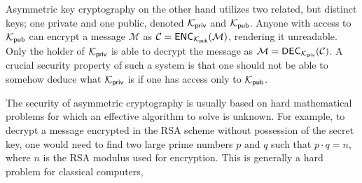 Asymmetric key cryptography on the other hand utilizes two related, but distinct keys; one private and one public, denoted $\mathcal{K}_{\mathsf{priv}}$ and $\mathcal{K}_{\mathsf{pub}}$.
Anyone with access to $\mathcal{K}_{\mathsf{pub}}$ can encrypt a message $\mathcal{M}$ as $\mathcal{C} = \mathsf{ENC}_{\mathcal{K}_{\mathsf{pub}}}(\mathcal{M})$, rendering it unreadable. Only the holder of $\mathcal{K}_{\mathsf{priv}}$ is able to decrypt the message
as $\mathcal{M} = \mathsf{DEC}_{\mathcal{K}_{\mathsf{priv}}}(\mathcal{C})$. A crucial security property of such a system is that one should not be able to somehow deduce what $\mathcal{K}_{\mathsf{priv}}$ is if one has access only to $\mathcal{K}_{\mathsf{pub}}$.

The security of asymmetric cryptography is usually based on hard mathematical problems for which an effective algorithm to solve is unknown. 
For example, to decrypt a message encrypted in the RSA scheme \cite{RSA78} without possession of the secret key, one would need to find two large prime numbers $p$ and $q$ such that 
$p \cdot q = n$, where $n$ is the RSA modulus used for encryption. This is generally a hard problem for classical computers,


